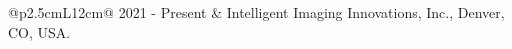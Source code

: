 \begin{tabular}{@{}p{2.5cm}L{12cm}@{}}
    {2021 - Present} & Intelligent Imaging Innovations, Inc., Denver, CO, USA.
    
\end{tabular} 
\\